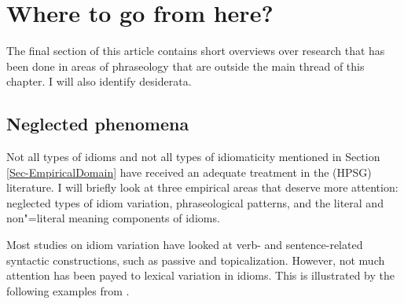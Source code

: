 \documentclass[output=paper]{langsci/langscibook}
\begin{document}


\section{Where to go from here?}
\label{Sec-WhereToGo}

The final section of this article contains short overviews over research that has been done in areas of phraseology that are outside the main thread of this chapter. I will also identify desiderata. 


\subsection{Neglected phenomena}
\label{Sec-Neglected}

Not all types of idioms  and not all types of idiomaticity mentioned in Section \ref{Sec-EmpiricalDomain} have received an adequate treatment in the (HPSG) literature.
I will briefly look at three empirical areas that deserve more attention: neglected types of idiom variation, phraseological patterns, and the literal and non"=literal meaning components of idioms.

Most studies on idiom variation have looked at verb- and sentence-related syntactic constructions, such as passive and topicalization. 
However, not much attention has been payed to lexical variation in idioms. This is illustrated by the following examples from \citet[, 191]{Richards:01}. 
\end{document}
